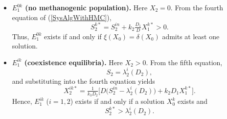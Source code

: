 \documentclass[runningheads]{llncs}
\begin{document}
\begin{itemize}[leftmargin=*,label=\raisebox{0.25ex}{\tiny$\bullet$}]
\begin{itemize}[leftmargin=*,label=\raisebox{0.25ex}{\tiny$\bullet$}]
\item \textbf{$E_1^{0k}$ (no methanogenic population).}  
Here $X_2=0$. From the fourth equation of (\ref{SysAlgWithHMC}),
\[
S_2^{k*} = S_2^{in} + k_2 \tfrac{D_1}{D} X_1^{k*} > 0.
\]
Thus, $E_1^{0k}$ exists if and only if $\xi(X_0)=\delta(X_0)$ admits at least one solution.
\item \textbf{$E_1^{ik}$ (coexistence equilibria).}  
Here $X_2>0$. From the fifth equation,
\[
S_2 = \lambda_2^i(D_2),
\]
and substituting into the fourth equation yields
\[
X_2^{ik*} = \tfrac{1}{k_3 D_2} \Big[ D\big(S_2^{in} - \lambda_2^i(D_2)\big) + k_2 D_1 X_1^{k*} \Big].
\]
Hence, $E_1^{ik}$ ($i=1,2$) exists if and only if a solution $X_0^k$ exists and
\[
S_2^{k*} > \lambda_2^i(D_2).
\]
\end{itemize}
\end{itemize}
\end{document}
